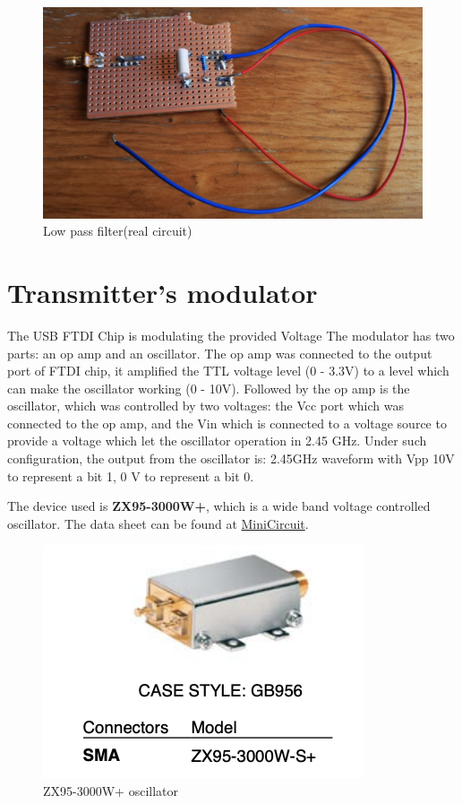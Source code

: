 \documentclass[12pt,a4paper]{report}
\begin{document}
\begin{figure}[H]
    \centerline{\includegraphics{rectifier.png}}
    \caption{Low pass filter(real circuit)}
    \label{RealLPF}
\end{figure}

\chapter{Transmitter's modulator}
The USB FTDI Chip is modulating the provided Voltage
The modulator has two parts: an op amp and an oscillator. The op amp was connected to the output port of FTDI chip, it amplified the TTL voltage level (0 - 3.3V) to a level which can make the oscillator working (0 - 10V). Followed by the op amp is the oscillator, which was controlled by two voltages: the Vcc port which was connected to the op amp, and the Vin which is connected to a voltage source to provide a voltage which let the oscillator operation in 2.45 GHz.
Under such configuration, the output from the oscillator is: 2.45GHz waveform with Vpp 10V to represent a bit 1, 0 V to represent a bit 0.

The device used is \textbf{ZX95-3000W+}, which is a wide band voltage controlled oscillator. The data sheet can be found at \href{https://www.minicircuits.com/pdfs/ZX95-3000W+.pdf}{MiniCircuit}.

\begin{figure}[ht]
    \centerline{\includegraphics[scale=1.5]{osc}}
    \caption{ZX95-3000W+ oscillator}
    \label{fig:osc}
\end{figure}
\end{document}
